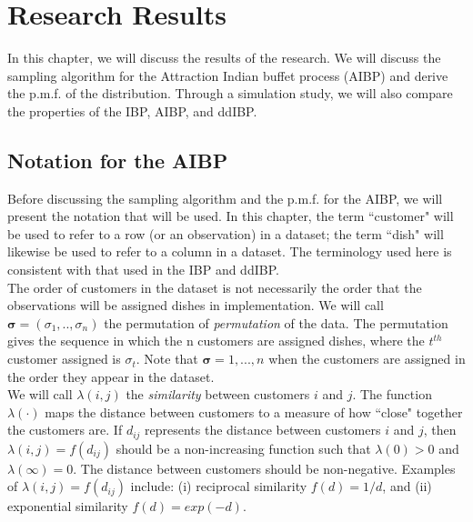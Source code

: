 \chapter{Research Results}
In this chapter, we will discuss the results of the research. We will discuss
the sampling algorithm for the Attraction Indian buffet process (AIBP) and
derive the p.m.f. of the distribution. Through a simulation study, we will also
compare the properties of the IBP, AIBP, and ddIBP.\\

\section{Notation for the AIBP}
Before discussing the sampling algorithm and the p.m.f. for the AIBP,  we will
present the notation that will be used. In this chapter, the term ``customer"
will be used to refer to a row (or an observation) in a dataset; the term ``dish"
will likewise be used to refer to a column in a dataset. The terminology used
here is consistent with that used in the IBP and ddIBP.\\

\noindent
The order of customers in the dataset is not necessarily the order that the
observations will be assigned dishes in implementation. We will call $\bm
\sigma = (\sigma_1,..,\sigma_n)$ the permutation of \textit{permutation} of the
data. The permutation gives the sequence in which the n customers are assigned
dishes, where the $t^{th}$ customer assigned is $\sigma_t$. Note that $\bm
\sigma = {1,...,n}$ when the customers are assigned in the order they appear
in the dataset.\\

\noindent
We will call $\lambda(i,j)$ the \textit{similarity} between customers $i$ and
$j$. The function $\lambda(\cdot)$ maps the distance between customers to a
measure of how ``close" together the customers are. If $d_{ij}$ represents the
distance between customers $i$ and $j$, then $\lambda(i,j)=f(d_{ij})$ should be
a non-increasing function such that $\lambda(0)>0$ and $\lambda(\infty)=0$. The
distance between customers should be non-negative. Examples of
$\lambda(i,j)=f(d_{ij})$ include: (i) reciprocal similarity $f(d) = 1/d$, and
(ii) exponential similarity $f(d) = exp(-d)$.\\


